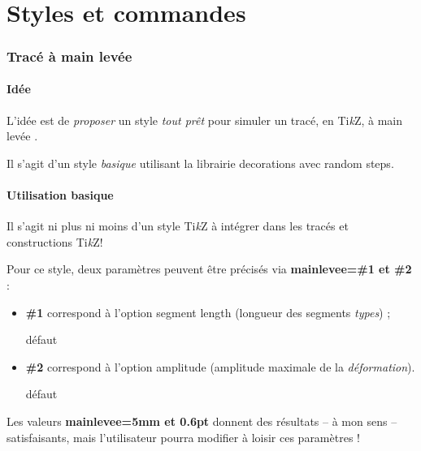\documentclass[french,a4paper,11pt]{article}
\providecommand\tikzlogo{Ti\textit{k}Z}
\let\TikZ\tikzlogo
\newcommand\Cle[1]{{\bfseries\sffamily\textlangle #1\textrangle}}
\begin{document}
\vfill~

\pagebreak

\part{Styles et commandes}

\section{Tracé à main levée}

\subsection{Idée}

\begin{tipblock}
L'idée est de \textit{proposer} un style \textit{tout prêt} pour simuler un tracé, en \TikZ, à \og main levée \fg.

Il s'agit d'un style \textit{basique} utilisant la librairie \textsf{decorations} avec \textsf{random steps}.
\end{tipblock}

\begin{DemoCode}
\end{DemoCode}

\subsection{Utilisation basique}

\begin{cautionblock}
Il s'agit ni plus ni moins d'un style \TikZ{} à intégrer dans les tracés et constructions \TikZ !

\smallskip

Pour ce style, deux paramètres peuvent être précisés via \Cle{mainlevee=\#1 et \#2} :

\begin{itemize}
	\item \Cle{\#1} correspond à l'option \textsf{segment length} (longueur des segments \textit{types}) ;
	
	\hfill{}défaut \Cle{5mm}
	\item \Cle{\#2} correspond à l'option \textsf{amplitude} (amplitude maximale de la \textit{déformation}).
	
	\hfill{}défaut \Cle{0.6pt}
\end{itemize}

Les valeurs \Cle{mainlevee=5mm et 0.6pt} donnent des résultats -- à mon sens -- satisfaisants, mais l'utilisateur pourra modifier à loisir ces paramètres !
\end{cautionblock}
\end{document}
